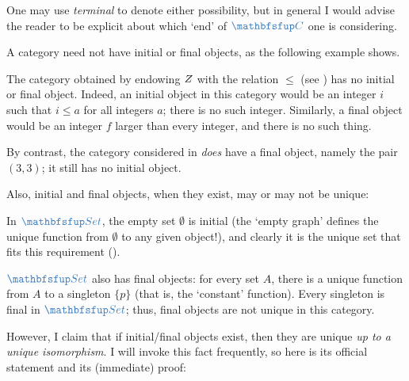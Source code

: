 One may use \emph{terminal} to denote either possibility, but in
general I would advise the reader to be explicit about which `end' of
$\categ{C}$ one is considering.

A category need not have initial or final objects, as the following
example shows.
\begin{exam}{}{}
  The category obtained by endowing $Z$ with the relation $\leq$ (see
  ) has no initial or final
  object. Indeed, an initial object in this category would be an
  integer $i$ such that $i \leq a$ for all integers $a$; there is no
  such integer. Similarly, a final object would be an integer $f$
  larger than every integer, and there is no such thing.

  By contrast, the category considered in
   \emph{does} have a final
  object, namely the pair $(3,3)$; it still has no initial object.
\end{exam}
Also, initial and final objects, when they exist, may or may not be
unique:

\begin{exam}{}{}
  In $\categ{Set}$, the empty set $\emptyset$ is initial (the `empty
  graph' defines the unique function from $\emptyset$ to any given
  object!), and clearly it is the unique set that fits this
  requirement ().

  $\categ{Set}$ also has final objects: for every set $A$, there is a
  unique function from $A$ to a singleton $\{p\}$ (that is, the
  `constant' function).  Every singleton is final in $\categ{Set}$;
  thus, final objects are not unique in this category.
\end{exam}
However, I claim that if initial/final objects exist, then they are
unique \emph{up to a unique isomorphism}. I will invoke this fact
frequently, so here is its official statement and its (immediate)
proof:

